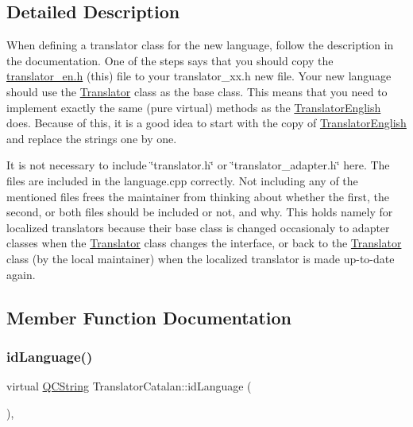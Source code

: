 \subsection{Detailed Description}
When defining a translator class for the new language, follow the description in the documentation. One of the steps says that you should copy the \mbox{\hyperlink{translator__en_8h_source}{translator\+\_\+en.\+h}} (this) file to your translator\+\_\+xx.\+h new file. Your new language should use the \mbox{\hyperlink{class_translator}{Translator}} class as the base class. This means that you need to implement exactly the same (pure virtual) methods as the \mbox{\hyperlink{class_translator_english}{Translator\+English}} does. Because of this, it is a good idea to start with the copy of \mbox{\hyperlink{class_translator_english}{Translator\+English}} and replace the strings one by one.

It is not necessary to include \char`\"{}translator.\+h\char`\"{} or \char`\"{}translator\+\_\+adapter.\+h\char`\"{} here. The files are included in the language.\+cpp correctly. Not including any of the mentioned files frees the maintainer from thinking about whether the first, the second, or both files should be included or not, and why. This holds namely for localized translators because their base class is changed occasionaly to adapter classes when the \mbox{\hyperlink{class_translator}{Translator}} class changes the interface, or back to the \mbox{\hyperlink{class_translator}{Translator}} class (by the local maintainer) when the localized translator is made up-\/to-\/date again. 

\subsection{Member Function Documentation}
\mbox{\label{class_translator_catalan_a3a55b5efcc87b72b7d9f89a845059847}} 
\subsubsection{\texorpdfstring{idLanguage()}{idLanguage()}}
{\footnotesize\ttfamily virtual \mbox{\hyperlink{class_q_c_string}{Q\+C\+String}} Translator\+Catalan\+::id\+Language (\begin{DoxyParamCaption}{ }\end{DoxyParamCaption})\hspace{0.3cm}{\ttfamily [inline]}, {\ttfamily [virtual]}}

